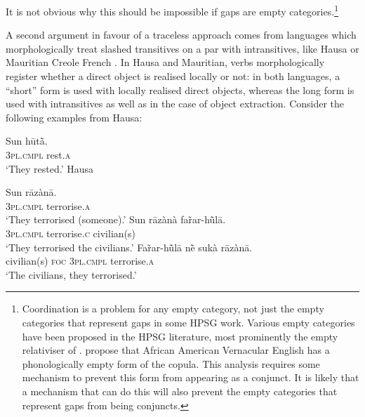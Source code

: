 \documentclass[output=paper
	        ,collection
	        ,collectionchapter
 	        ,biblatex
                ,babelshorthands
                ,newtxmath
                ,draftmode
                ,colorlinks, citecolor=brown
]{langscibook}
\begin{document}
{\begin{exe} \ex \begin{xlist} \label{ex:UDC:22}

\end{xlist}
\end{exe}

\noindent
It is not obvious why this should be impossible if gaps are empty
categories.\footnote{Coordination is a problem for any empty category,
  not just the empty categories that represent gaps in some HPSG
  work. Various empty categories have been proposed in the HPSG
  literature, most prominently the empty relativiser of
  \citet[Chapter~5]{Pollard:Sag:94}. \citet[15.3.5]{Sag:Wasow:ea:03}
  propose that African American Vernacular English has a
  phonologically empty form of the copula. This analysis requires some
  mechanism to prevent this form from appearing as a conjunct. It is
  likely that a mechanism that can do this will also prevent the empty
  categories that represent gaps from being conjuncts.
 }

A second argument in favour of a traceless approach comes from
languages which morphologically treat slashed transitives on a par
with intransitives, like Hausa \citep{crysmann_b04yom} or Mauritian
Creole French \citep{Henri10}. In Hausa and Mauritian, verbs
morphologically register whether a direct object is realised locally
or not: in both languages, a ``short'' form is used with locally
realised direct objects, whereas the long form is used with
intransitives as well as in the case of object extraction. Consider
the following examples from Hausa:

\begin{exe}

  \ex \gll Sun hūtā̀.\\
  \textsc{3pl.cmpl} rest.\textsc{a}\\
  \glt `They rested.' \label{ex:UDC:Hau:intr}
  \ex Hausa\label{ex:UDC:Hau:tr}
  \begin{xlist}
    \ex \gll Sun rāzànā.\\
    \textsc{3pl.cmpl} terrorise.\textsc{a}\\
    \glt `They terrorised (someone).' \hfill \citep[632]{newman_p00}
    \ex \gll Sun rāzànà far̃ar-hū̀lā.\\
    \textsc{3pl.cmpl} terrorise.\textsc{c} civilian(s)\\
    \glt `They terrorised the civilians.' \hfill \citep[632]{newman_p00}
    \ex \gll Far̃ar-hū̀lā nḕ sukà rāzànā.\\
    civilian(s) \textsc{foc} \textsc{3pl.cmpl} terrorise.\textsc{a}\\
    \glt `The civilians, they terrorised.' 
  \end{xlist}
  

\end{exe}}
\end{document}
